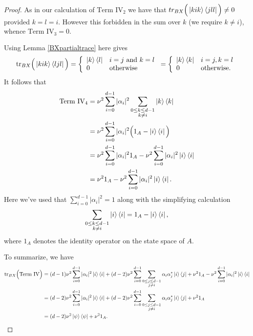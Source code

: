 \documentclass[reqno]{amsart}
\numberwithin{lemma}{section}
\numberwithin{proposition}{section}
\newcommand{\tr}{\textnormal{tr}}
\begin{document}
{\begin{proof}
\smallskip

 As in our calculation of $\text{Term IV}_{2}$ we have that $tr_{BX} \Big ( \ket{kik}\bra{jll}\Big ) \neq 0$ provided $k = l = i$. However this forbidden in the sum over $k$ (we require $k \neq i$), whence $\text{Term IV}_{3} = 0$.

\smallskip

Using Lemma \ref{BXpartialtrace} here gives
\begin{equation*}
\tr_{BX} \Big ( \ket{kik} \bra{ljl} \Big ) = \left \{ \begin{array}{ll}
\ket{k}\bra{l} & i=j \ \text{and} \ k=l\\
0 & \text{otherwise}
\end{array}
\right .
= \left \{ \begin{array}{ll}
\ket{k}\bra{k} & i = j, k = l\\
0 & \text{otherwise.}
\end{array}
\right .
\end{equation*}
It follows that
\begin{align*}
\text{Term IV}_{4} &= \nu^{2} \sum_{i=0}^{d-1} \vert \alpha_{i} \vert^{2} \sum_{\substack{0 \leq k \leq d-1\\ k \neq i}} \ket{k} \bra{k}\\
&= \nu^{2} \sum_{i=0}^{d-1} \vert \alpha_{i} \vert^{2} \Big ( 1_{A} - \ket{i}\bra{i} \Big )\\
&= \nu^{2} \sum_{i=0}^{d-1} \vert \alpha_{i} \vert^{2} 1_{A} - \nu^{2} \sum_{i=0}^{d-1} \vert \alpha_{i} \vert^{2} \ket{i} \bra{i}\\
&= \nu^{2} 1_{A} - \nu^{2} \sum_{i=0}^{d-1} \vert \alpha_{i} \vert^{2} \ket{i} \bra{i}.
\end{align*}
Here we've used that $\sum_{i=0}^{d-1} \vert \alpha_{i} \vert^{2} = 1$ along with the simplifying calculation
\begin{equation*}
\sum_{\substack{0 \leq k \leq d-1\\ k \neq i}} \ket{i}\bra{i} = 1_{A} - \ket{i}\bra{i},
\end{equation*}
where $1_{A}$ denotes the identity operator on the state space of $A$.

To summarize, we have
\begin{align*}
\tr_{BX} \Big ( \text{Term IV} \Big ) &= (d-1) \nu^{2} \sum_{i=0}^{d-1} \vert \alpha_{i} \vert^{2} \ket{i} \bra{i} + (d-2) \nu^{2} \sum_{i=0}^{d-1} \sum_{\substack{0 \leq j \leq d-1\\ j \neq i}} \alpha_{i} \alpha_{j}^{*} \ket{i} \bra{j} + \nu^{2} 1_{A} - \nu^{2} \sum_{i=0}^{d-1} \vert \alpha_{i} \vert^{2} \ket{i} \bra{i}\\
&= (d-2) \nu^{2} \sum_{i=0}^{d-1} \vert \alpha_{i} \vert^{2} \ket{i} \bra{i} + (d-2) \nu^{2} \sum_{i=0}^{d-1} \sum_{\substack{0 \leq j \leq d-1\\ j \neq i}} \alpha_{i} \alpha_{j}^{*} \ket{i} \bra{j} + \nu^{2} 1_{A}\\
&= (d-2) \nu^{2} \ket{\psi} \bra{\psi} + \nu^{2} 1_{A}.
\end{align*}


\end{proof}}
\end{document}
